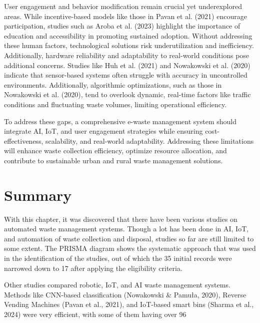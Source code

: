 User engagement and behavior modification remain crucial yet underexplored areas. While incentive-based models like those in Pavan et al. (2021) encourage participation, studies such as Aroba et al. (2023) highlight the importance of education and accessibility in promoting sustained adoption. Without addressing these human factors, technological solutions risk underutilization and inefficiency. Additionally, hardware reliability and adaptability to real-world conditions pose additional concerns. Studies like Huh et al. (2021) and Nowakowski et al. (2020) indicate that sensor-based systems often struggle with accuracy in uncontrolled environments. Additionally, algorithmic optimizations, such as those in Nowakowski et al. (2020), tend to overlook dynamic, real-time factors like traffic conditions and fluctuating waste volumes, limiting operational efficiency.

To address these gaps, a comprehensive e-waste management system should integrate AI, IoT, and user engagement strategies while ensuring cost-effectiveness, scalability, and real-world adaptability. Addressing these limitations will enhance waste collection efficiency, optimize resource allocation, and contribute to sustainable urban and rural waste management solutions.


\section{Summary}
With this chapter, it was discovered that there have been various studies on automated waste management systems. Though a lot has been done in AI, IoT, and automation of waste collection and disposal, studies so far are still limited to some extent. The PRISMA diagram shows the systematic approach that was used in the identification of the studies, out of which the 35 initial records were narrowed down to 17 after applying the eligibility criteria.

Other studies compared robotic, IoT, and AI waste management systems. Methods like CNN-based classification (Nowakowski & Pamuła, 2020), Reverse Vending Machines (Pavan et al., 2021), and IoT-based smart bins (Sharma et al., 2024) were very efficient, with some of them having over 96%

